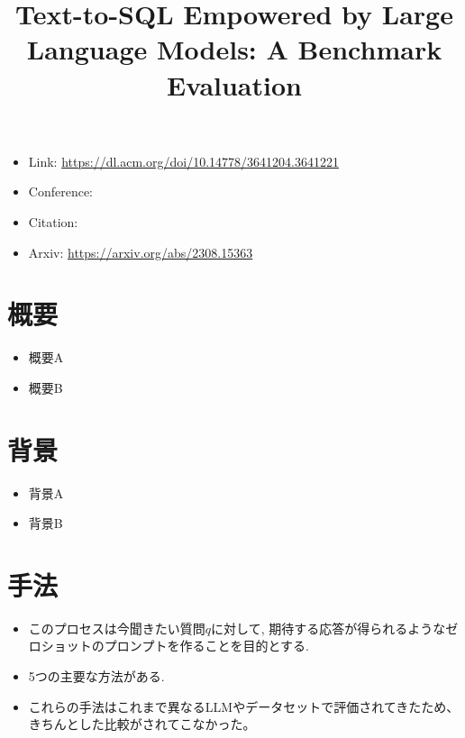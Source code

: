 \documentclass[dvipdfmx,uplatex]{jsarticle}
\title{Text-to-SQL Empowered by Large Language Models: A
Benchmark Evaluation}
\author{\empty}
\date{\empty}
\theoremstyle{remark}
\newenvironment{simplebox}{
    \begin{tcolorbox}[
        fonttitle=\bfseries,
    ]
}{
    \end{tcolorbox}
}
\newenvironment{method}[1]{
    \begin{tcolorbox}[
        colframe=green!50!black,
        colback=green!50!black!10!white,
        colbacktitle=green!50!black!40!white,
        coltitle=black,
        fonttitle=\bfseries,
        title={#1}
    ]
}{
    \end{tcolorbox}
}
\begin{document}
\maketitle

\begin{itemize}
    \item Link: \url{https://dl.acm.org/doi/10.14778/3641204.3641221}
    \item Conference:
    \item Citation: \cite{text2sql_benchmark}
    \item Arxiv: \url{https://arxiv.org/abs/2308.15363}
\end{itemize}


\section{概要}
\begin{simplebox}
\begin{itemize}
    \item 概要A
    \item 概要B
\end{itemize}
\end{simplebox}


\section{背景}
\begin{simplebox}
\begin{itemize}
    \item 背景A
    \item 背景B
\end{itemize}
\end{simplebox}


\section{手法}
\begin{method}{Question Representation}
\begin{itemize}
    \item このプロセスは今聞きたい質問$q$に対して, 期待する応答が得られるようなゼロショットのプロンプトを作ることを目的とする.
    \item 5つの主要な方法がある.
    \item これらの手法はこれまで異なるLLMやデータセットで評価されてきたため、きちんとした比較がされてこなかった。
\end{itemize}
\end{method}
\end{document}
